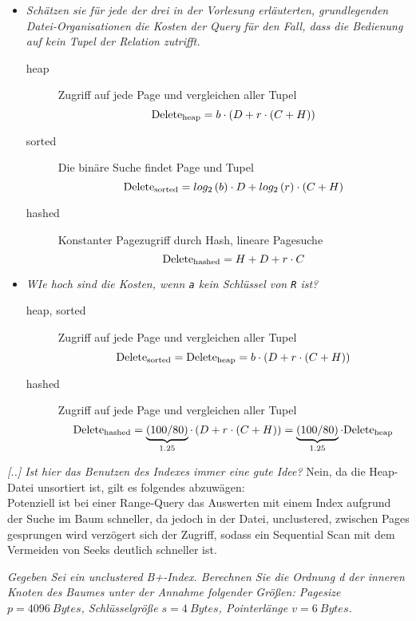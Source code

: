 \documentclass{uni_tue_template}
\newcommand{\code}[1]{\texttt{{\footnotesize #1}}}
\begin{document}
  \item \begin{itemize}
    \item \emph{Schätzen sie für jede der drei in der Vorlesung erläuterten, grundlegenden Datei-Organisationen die Kosten der Query für den Fall, dass die Bedienung auf kein Tupel der Relation zutrifft.}
    \begin{description}
    \item[heap] Zugriff auf jede Page und vergleichen aller Tupel \[\text{Delete\textsubscript{heap}} = b \cdot \left(D + r \cdot \left(C + H\right)\right)\]
    \item[sorted] Die binäre Suche findet Page und Tupel \[\text{Delete\textsubscript{sorted}} = log_2\left(b\right) \cdot D + log_2\left(r\right) \cdot \left(C + H\right)\]
    \item[hashed] Konstanter Pagezugriff durch Hash, lineare Pagesuche \[\text{Delete\textsubscript{hashed}} = H + D + r \cdot C\]
    \end{description}
    \item \emph{WIe hoch sind die Kosten, wenn \code{a} kein Schlüssel von \code{R} ist?}
    \begin{description}
    \item[heap, sorted] Zugriff auf jede Page und vergleichen aller Tupel \[\text{Delete\textsubscript{sorted}} = \text{Delete\textsubscript{heap}} = b \cdot \left(D + r \cdot \left(C + H\right)\right)\]
    \item[hashed] Zugriff auf jede Page und vergleichen aller Tupel \[\text{Delete\textsubscript{hashed}} = \underbrace{\left(100/80\right)}_{1.25} \cdot \left(D + r \cdot \left(C + H\right)\right) = \underbrace{\left(100/80\right)}_{1.25} \cdot \text{Delete\textsubscript{heap}}\]
    \end{description}
    \end{itemize}
  \item \emph{[..] Ist hier das Benutzen des Indexes immer eine gute Idee?}
    Nein, da die Heap-Datei unsortiert ist, gilt es folgendes abzuwägen:\\
    Potenziell ist bei einer Range-Query das Auswerten mit einem Index aufgrund der Suche im Baum schneller, da jedoch in der Datei, unclustered, zwischen Pages gesprungen wird verzögert sich der Zugriff, sodass ein Sequential Scan mit dem Vermeiden von Seeks deutlich schneller ist.
\subExEnd{}
%
\newpage 
%
\exercise{}
  \item \emph{Gegeben Sei ein unclustered B+-Index. Berechnen Sie die Ordnung d der inneren Knoten des Baumes unter der Annahme folgender Größen: Pagesize $p = \SI{4096}{Bytes}$, Schlüsselgröße $s = \SI{4}{Bytes}$, Pointerlänge $v = \SI{6}{Bytes}$.}
\end{document}
